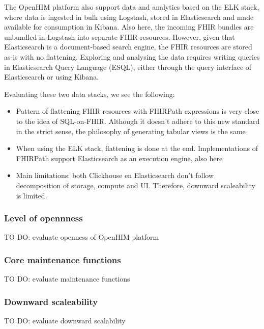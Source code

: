 \documentclass[
  authoryear]{elsarticle}
\providecommand{\tightlist}{%
  \setlength{\itemsep}{0pt}\setlength{\parskip}{0pt}}\usepackage{longtable,booktabs,array}
\begin{document}
The OpenHIM platform also support data and analytics based on the ELK
stack, where data is ingested in bulk using Logstash, stored in
Elasticsearch and made available for consumption in Kibana. Also here,
the incoming FHIR bundles are unbundled in Logstash into separate FHIR
resources. However, given that Elasticsearch is a document-based search
engine, the FHIR resources are stored as-is with no flattening.
Exploring and analysing the data requires writing queries in
Elasticsearch Query Language (ES\textbar QL), either through the query
interface of Elasticsearch or using Kibana.

Evaluating these two data stacks, we see the following:

\begin{itemize}
\tightlist
\item
  Pattern of flattening FHIR resources with FHIRPath expressions is very
  close to the idea of SQL-on-FHIR. Although it doesn't adhere to this
  new standard in the strict sense, the philosophy of generating tabular
  views is the same
\item
  When using the ELK stack, flattening is done at the end.
  Implementations of FHIRPath support Elasticsearch as an execution
  engine, also here
\item
  Main limitations: both Clickhouse en Elasticsearch don't follow
  decomposition of storage, compute and UI. Therefore, downward
  scaleability is limited.
\end{itemize}

\subsubsection{Level of opennness}\label{level-of-opennness}

TO DO: evaluate openness of OpenHIM platform

\subsubsection{Core maintenance
functions}\label{core-maintenance-functions}

TO DO: evaluate maintenance functions

\subsubsection{Downward scaleability}\label{downward-scaleability}

TO DO: evaluate downward scalability
\end{document}
